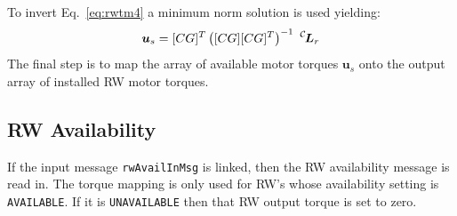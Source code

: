 To invert Eq.~\eqref{eq:rwtm4} a minimum norm solution is used yielding: 
\begin{equation}
 \bm u_{s}  = [CG]^T \left([CG][CG]^T\right)^{-1}\  \leftexp{C}{\bm L}_{r}
\end{equation}
The final step is to map the array of available motor torques $\bm u_{s}$ onto the output array of installed RW motor torques.  


\subsection{RW Availability} 
If the input message  {\tt rwAvailInMsg} is linked, then the RW availability message is read in. The torque mapping is only used for RW's whose availability setting is {\tt AVAILABLE}.  If it is {\tt UNAVAILABLE} then that RW output torque is set to zero.  

